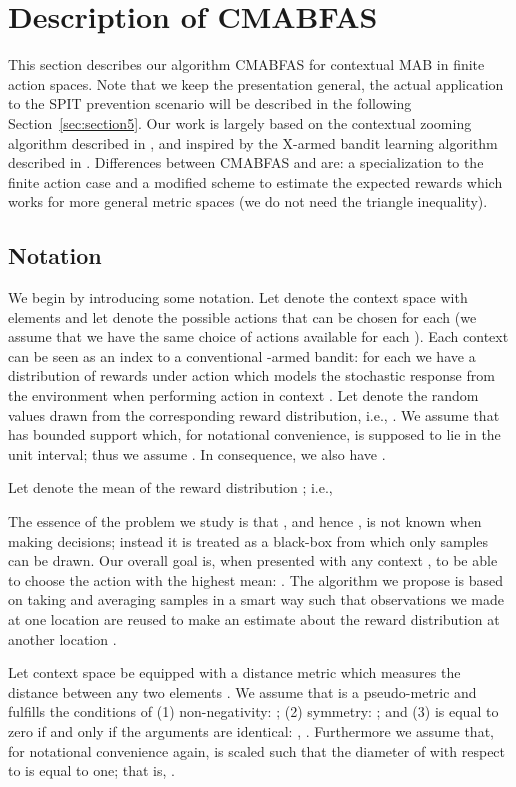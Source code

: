 \documentclass{llncs}
\begin{document}
\section{Description of CMABFAS}
This section describes
our algorithm CMABFAS for contextual MAB in finite action spaces.
Note that we keep the presentation general, the actual application 
to the SPIT prevention scenario will be described in the following
Section~\ref{sec:section5}. Our work is largely based on the contextual 
zooming algorithm described in \cite{DBLP:journals/corr/abs-0907-3986},
and inspired by the X-armed bandit learning algorithm described in \cite{Xarmed_bubeck}. 
Differences between CMABFAS and \cite{DBLP:journals/corr/abs-0907-3986} are: a specialization to 
the finite action case and a modified scheme to estimate the expected rewards which works for
more general metric spaces (we do not need the triangle inequality). 

\subsection{Notation} 
We begin by introducing some notation. Let  denote the context space 
with elements  and let  denote the possible
actions that can be chosen for each  (we assume that we have the same choice of 
actions available for each ). Each context  can be seen as an index to a conventional -armed bandit: 
for each  we have a distribution of rewards  under action
 which models the stochastic response from the environment when performing
action  in context . Let  denote the random values drawn from the
corresponding reward distribution, i.e., . We assume that
 has bounded support which, for notational convenience, is 
supposed to lie in the unit interval; thus we assume 
. In consequence, we also have
. 

Let  denote the mean of the reward distribution ; i.e.,


The essence of the problem we study is that , and hence
, is not known when making decisions; instead it is treated as a
black-box from which only samples can be drawn. Our overall goal is, when 
presented with any context , to be able to choose the action with the 
highest mean: . The algorithm we propose is 
based on taking and averaging samples in a smart way such that observations
we made at one location  are reused to make an estimate about the
reward distribution at another location .

Let context space  be equipped with a distance metric 
 which measures the distance between any two elements 
. We assume that  is a pseudo-metric and fulfills the
conditions of (1) non-negativity: ; (2) symmetry: 
; and (3) is equal to zero if and only if the arguments
are identical: , .  
Furthermore we assume that, for notational convenience again,  is scaled
such that the diameter of  with respect to  is equal to 
one; that is, . 
\end{document}
